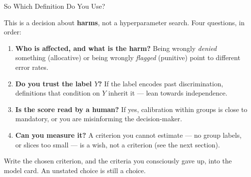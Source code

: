 
\begin{frame}{So Which Definition Do You Use?}

    This is a decision about \textbf{harms}, not a hyperparameter search. Four questions, in order:

    \vspace{0.8em}

    \begin{enumerate}
        \setlength\itemsep{0.55em}
        \item \textbf{Who is affected, and what is the harm?} Being wrongly \emph{denied}
              something (allocative) or being wrongly \emph{flagged} (punitive) point to different
              error rates.
        \item \textbf{Do you trust the label $Y$?} If the label encodes past discrimination,
              definitions that condition on $Y$ inherit it --- lean towards independence.
        \item \textbf{Is the score read by a human?} If yes, calibration within groups is close to
              mandatory, or you are misinforming the decision-maker.
        \item \textbf{Can you measure it?} A criterion you cannot estimate --- no group labels, or
              slices too small --- is a wish, not a criterion (see the next section).
    \end{enumerate}

    \vspace{0.9em}
    \begin{block}{}
        \centering
        Write the chosen criterion, and the criteria you consciously gave up, into the model card.
        An unstated choice is still a choice.
    \end{block}
\end{frame}
